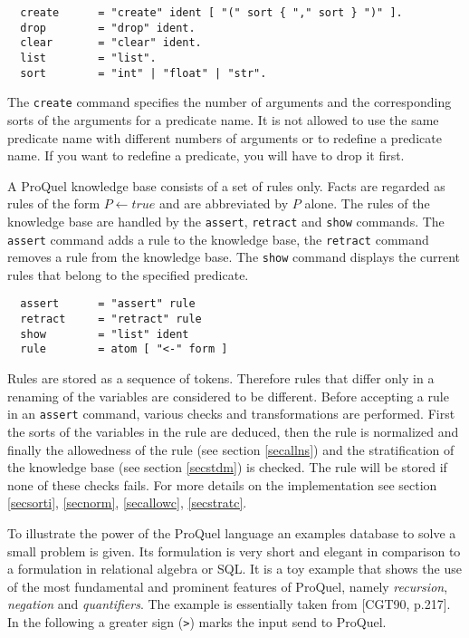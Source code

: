 \begin{verbatim}
  create      = "create" ident [ "(" sort { "," sort } ")" ].
  drop        = "drop" ident.
  clear       = "clear" ident.
  list        = "list".
  sort        = "int" | "float" | "str".
\end{verbatim}

The \verb.create. command specifies the number of arguments and the corresponding sorts of the
arguments for a predicate name. It is not allowed to use the same predicate name with different 
numbers of arguments or to redefine a predicate name. If you want to redefine a predicate, you 
will have to drop it first. 

\label{secruleman}
A ProQuel knowledge base consists of a set of rules only. Facts are regarded as rules of the form
$P \leftarrow true$ and are abbreviated by $P$ alone. The rules of the knowledge base are handled 
by the \verb.assert., \verb.retract. and \verb.show. commands. The \verb.assert. command adds a 
rule to the knowledge base, the \verb.retract. command removes a rule from the knowledge base. The 
\verb.show. command displays the current rules that belong to the specified predicate.

\begin{verbatim}
  assert      = "assert" rule
  retract     = "retract" rule
  show        = "list" ident
  rule        = atom [ "<-" form ]
\end{verbatim}

Rules are stored as a sequence of tokens. Therefore rules that differ only in a renaming of the
variables are considered to be different. Before accepting a rule in an \verb.assert. command, 
various checks and transformations are performed. First the sorts of the variables in the rule 
are deduced, then the rule is normalized and finally the allowedness of the rule (see section 
\ref{secallns}) and the stratification of the knowledge base (see section \ref{secstdm}) is 
checked. The rule will be stored if none of these checks fails. For more details on the 
implementation see section \ref{secsorti}, \ref{secnorm}, \ref{secallowc}, \ref{secstratc}.

\label{secexam}
To illustrate the power of the ProQuel language an examples database to solve a small problem 
is given. Its formulation is very short and elegant in comparison to a formulation in relational
algebra or SQL. It is a toy example that shows the use of the most fundamental and prominent 
features of ProQuel, namely {\em recursion}, {\em negation} and {\em quantifiers}. The example 
is essentially taken from [CGT90, p.217]. In the following a greater sign (\verb/>/) marks the
input send to ProQuel.

